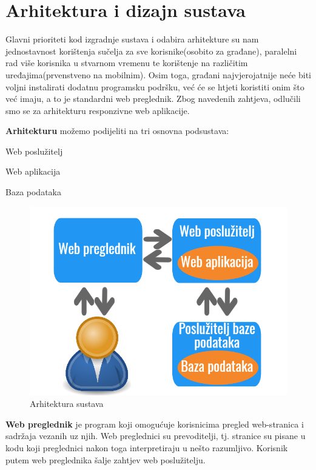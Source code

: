 \chapter{Arhitektura i dizajn sustava}

		Glavni prioriteti kod izgradnje sustava i odabira arhitekture su nam jednostavnost korištenja sučelja za sve korisnike(osobito za građane), paralelni rad više korisnika u stvarnom vremenu te korištenje na različitim uređajima(prvenstveno na mobilnim). Osim toga, građani najvjerojatnije neće biti voljni instalirati dodatnu programsku podršku, već će se htjeti koristiti onim što već imaju, a to je standardni web preglednik. Zbog navedenih zahtjeva, odlučili smo se za arhitekturu responzivne web aplikacije.
		\newline
		
		\textbf{Arhitekturu} možemo podijeliti na tri osnovna podsustava:
		\begin{packed_item}
		\item Web poslužitelj
		\item Web aplikacija
		\item Baza podataka
		\end{packed_item}
		
		\begin{figure}[H]
					\includegraphics[scale=0.6]{slike/webapp.png}
					\centering
					\caption{Arhitektura sustava}
					\label{fig:Arhitektura-sustava}
		\end{figure}
		\newpage
		
		\textbf{Web preglednik} je program koji omogućuje korisnicima pregled web-stranica i sadržaja vezanih uz njih. Web preglednici su prevoditelji, tj. stranice su pisane u kodu koji preglednici nakon toga interpretiraju u nešto razumljivo. Korisnik putem web preglednika šalje zahtjev web poslužitelju.
		

